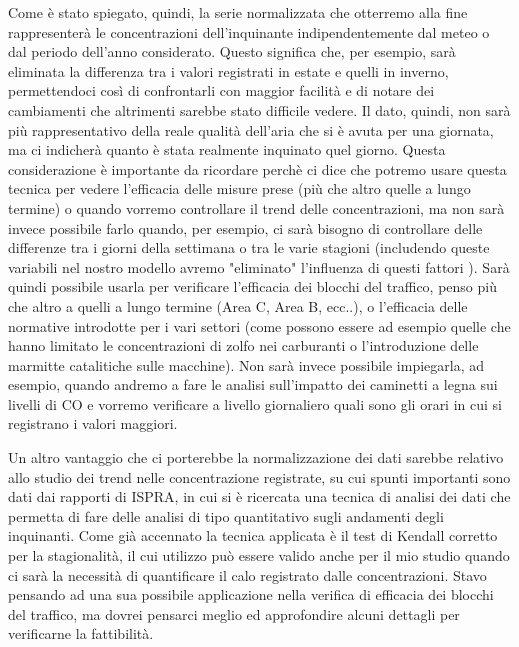 \documentclass{article}
\begin{document}
Come è stato spiegato, quindi, la serie normalizzata che otterremo alla fine rappresenterà le concentrazioni dell'inquinante indipendentemente dal meteo o dal periodo dell'anno considerato. Questo significa che, per esempio, sarà eliminata la differenza tra i valori registrati in estate e quelli in inverno, permettendoci così di confrontarli con maggior facilità e di notare dei cambiamenti che altrimenti sarebbe stato difficile vedere. Il dato, quindi, non sarà più rappresentativo della reale qualità dell'aria che si è avuta per una giornata, ma ci indicherà quanto è stata realmente inquinato quel giorno.
Questa considerazione è importante da ricordare perchè ci dice che potremo usare questa tecnica per vedere l'efficacia delle misure prese (più che altro quelle a lungo termine) o quando vorremo controllare il trend delle concentrazioni, ma non sarà invece possibile farlo quando, per esempio, ci sarà bisogno di controllare delle differenze tra i giorni della settimana o tra le varie stagioni (includendo queste variabili nel nostro modello avremo "eliminato" l'influenza di questi fattori ).
Sarà quindi possibile usarla per verificare l'efficacia dei blocchi del traffico, penso più che altro a quelli a lungo termine (Area C, Area B, ecc..), o l'efficacia delle normative introdotte per i vari settori (come possono essere ad esempio quelle che hanno limitato le concentrazioni di zolfo nei carburanti o l'introduzione delle marmitte catalitiche sulle macchine).
Non sarà invece possibile impiegarla, ad esempio, quando andremo a fare le analisi sull'impatto dei caminetti a legna sui livelli di CO e vorremo verificare a livello giornaliero quali sono gli orari in cui si registrano i valori maggiori. 

Un altro vantaggio che ci porterebbe la normalizzazione dei dati sarebbe relativo allo studio dei trend nelle concentrazione registrate, su cui spunti importanti sono dati dai rapporti di ISPRA\cite{cattani2018analisi}\cite{cattani2014analisi}, in cui si è ricercata una tecnica di analisi dei dati che permetta di fare delle analisi di tipo quantitativo sugli andamenti degli inquinanti. Come già accennato la tecnica applicata è il test di Kendall corretto per la stagionalità, il cui utilizzo può essere valido anche per il mio studio quando ci sarà la necessità di quantificare il calo registrato dalle concentrazioni. Stavo pensando ad una sua possibile applicazione nella verifica di efficacia dei blocchi del traffico, ma dovrei pensarci meglio ed approfondire alcuni dettagli per verificarne la fattibilità. 
\end{document}
